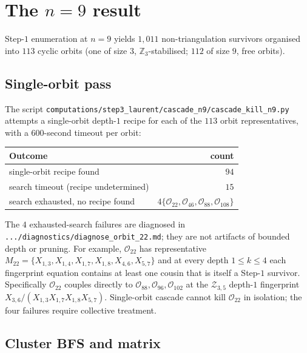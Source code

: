 \documentclass[11pt]{article}
\theoremstyle{definition}
\begin{document}
\section{The $n=9$ result}\label{sec:n9}

Step-$1$ enumeration at $n=9$ yields $1{,}011$ non-triangulation
survivors organised into $113$ cyclic orbits (one of size $3$,
$\mathbb Z_3$-stabilised; $112$ of size $9$, free orbits).

\subsection{Single-orbit pass}\label{subsec:single}

The script \verb|computations/step3_laurent/cascade_n9/cascade_kill_n9.py|
attempts a single-orbit depth-$1$ recipe for each of the $113$ orbit
representatives, with a $600$-second timeout per orbit:

\begin{center}
\begin{tabular}{lr}
\toprule
Outcome & count \\
\midrule
single-orbit recipe found & $94$ \\
search timeout (recipe undetermined) & $15$ \\
search exhausted, no recipe found &
$4$\quad $\{\mathcal O_{22},\mathcal O_{46},\mathcal O_{88},\mathcal O_{108}\}$ \\
\bottomrule
\end{tabular}
\end{center}

The $4$ exhausted-search failures are diagnosed in
\verb|.../diagnostics/diagnose_orbit_22.md|; they are not artifacts
of bounded depth or pruning. For example, $\mathcal O_{22}$ has
representative $M_{22}=\{X_{1,3},X_{1,4},X_{1,7},X_{1,8},X_{4,6},
X_{5,7}\}$ and at every depth $1\le k\le 4$ each fingerprint
equation contains at least one cousin that is itself a Step-$1$
survivor. Specifically $\mathcal O_{22}$ couples directly to
$\mathcal O_{88},\mathcal O_{96},\mathcal O_{102}$ at the
$\mathcal Z_{3,5}$ depth-$1$ fingerprint
$X_{3,6}/(X_{1,3}X_{1,7}X_{1,8}X_{5,7})$. Single-orbit cascade
cannot kill $\mathcal O_{22}$ in isolation; the four failures
require collective treatment.

\subsection{Cluster BFS and matrix}\label{subsec:cluster}
\end{document}
